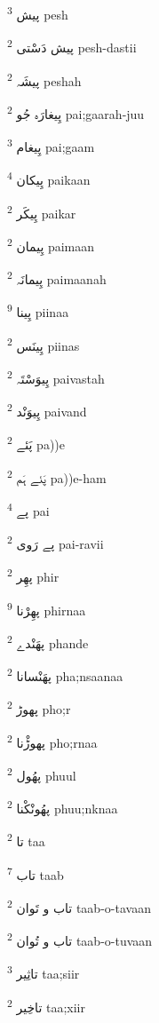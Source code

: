 \documentclass[12pt]{article}
\begin{document}
\begin{multicols}{5}
{\ur پیش}   \textsuperscript{3} pesh

{\ur پیش دَسْتی}   \textsuperscript{2} pesh-dastii

{\ur پیشَہ}   \textsuperscript{2} peshah

{\ur پِیغارَہ جُو}   \textsuperscript{2} pai;gaarah-juu

{\ur پِیغام}   \textsuperscript{3} pai;gaam

{\ur پِیکان}   \textsuperscript{4} paikaan

{\ur پِیکَر}   \textsuperscript{2} paikar

{\ur پِیمان}   \textsuperscript{2} paimaan

{\ur پِیمانَہ}   \textsuperscript{2} paimaanah

{\ur پِینا}   \textsuperscript{9} piinaa

{\ur پِینَس}   \textsuperscript{2} piinas

{\ur پِیوَسْتَہ}   \textsuperscript{2} paivastah

{\ur پِیوَنْد}   \textsuperscript{2} paivand

{\ur پَئے}   \textsuperscript{2} pa))e

{\ur پَئے ہَم}   \textsuperscript{2} pa))e-ham

{\ur پے}   \textsuperscript{4} pai

{\ur پے رَوی}   \textsuperscript{2} pai-ravii

{\ur پھِر}   \textsuperscript{2} phir

{\ur پھِرْنا}   \textsuperscript{9} phirnaa

{\ur پھَنْدے}   \textsuperscript{2} phande

{\ur پھَنْسانا}   \textsuperscript{2} pha;nsaanaa

{\ur پھوڑ}   \textsuperscript{2} pho;r

{\ur پھوڑْنا}   \textsuperscript{2} pho;rnaa

{\ur پھُول}   \textsuperscript{2} phuul

{\ur پھُونْکْنا}   \textsuperscript{2} phuu;nknaa

{\ur تا}   \textsuperscript{2} taa

{\ur تاب}   \textsuperscript{7} taab

{\ur تاب و تَوان}   \textsuperscript{2} taab-o-tavaan

{\ur تاب و تُوان}   \textsuperscript{2} taab-o-tuvaan

{\ur تاثِیر}   \textsuperscript{3} taa;siir

{\ur تاخِیر}   \textsuperscript{2} taa;xiir


\end{multicols}
\end{document}
